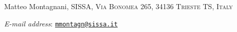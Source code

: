 \documentclass[oneside, hidelinks, 12pt, a4paper,reqno]{amsart}
\makeatletter
\theoremstyle{plain}
\theoremstyle{definition}
\theoremstyle{plain}
\newcommand{\Solid}{\blacksquare}
\newcommand{\Addresses}{{%
  \bigskip
  \footnotesize

  Matteo Montagnani, \textsc{SISSA, Via Bonomea 265, 34136 Trieste TS, Italy}\par\nopagebreak
  \textit{E-mail address}: \href{mailto:mmontagn@sissa.it}{\texttt{mmontagn@sissa.it}}

  \medskip 

  
}}
\makeatother
\begin{document}

%


\printbibliography

\Addresses
\end{document}
